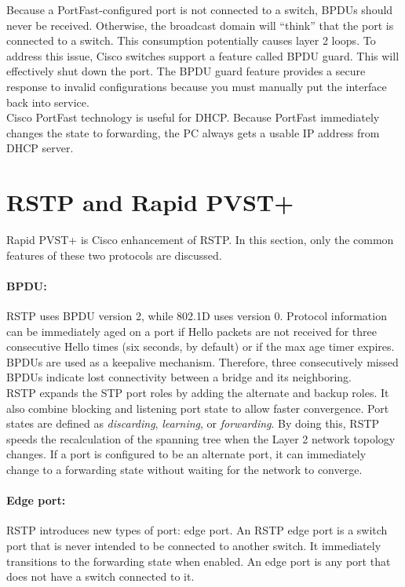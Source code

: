 Because a PortFast-configured port is not connected to a switch, BPDUs should never be received. Otherwise, the broadcast domain will ``think'' that the port is connected to a switch. This consumption potentially causes layer 2 loops. To address this issue, Cisco switches support a feature called BPDU guard. This will effectively shut down the port. The BPDU guard feature provides a secure response to invalid configurations because you must manually put the interface back into service.\\

Cisco PortFast technology is useful for DHCP. Because PortFast immediately changes the state to forwarding, the PC always gets a usable IP address from DHCP server.


\section{RSTP and Rapid PVST+}

Rapid PVST+ is Cisco enhancement of RSTP. In this section, only the common features of these two protocols are discussed.

\paragraph{BPDU:} RSTP uses BPDU version 2, while 802.1D uses version 0. Protocol information can be immediately aged on a port if Hello packets are not received for three consecutive Hello times (six seconds, by default) or if the max age timer expires. BPDUs are used as a keepalive mechanism. Therefore, three consecutively missed BPDUs indicate lost connectivity between a bridge and its neighboring.\\

RSTP expands the STP port roles by adding the alternate and backup roles. It also combine blocking and listening port state to allow faster convergence. Port states are defined as \emph{discarding}, \emph{learning}, or \emph{forwarding}. By doing this, RSTP speeds the recalculation of the spanning tree when the Layer 2 network topology changes. If a port is configured to be an alternate port, it can immediately change to a forwarding state without waiting for the network to converge.

\paragraph{Edge port:} RSTP introduces new types of port: edge port. An RSTP edge port is a switch port that is never intended to be connected to another switch. It immediately transitions to the forwarding state when enabled. An edge port is any port that does not have a switch connected to it.

